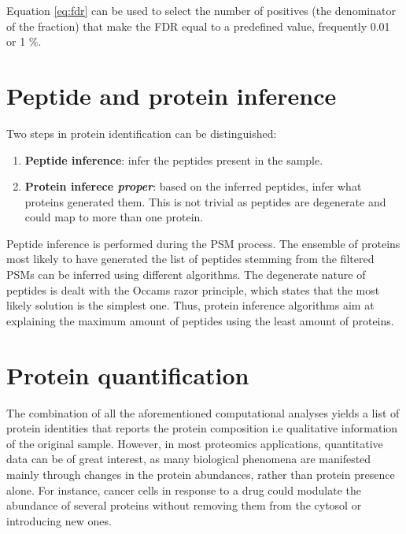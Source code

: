 \documentclass[11pt, a4paper]{report}
\begin{document}
Equation \ref{eq:fdr} can be used to select the number of positives (the denominator of the fraction) that make the FDR equal to a predefined value, frequently 0.01 or 1 \%.

%

\section{Peptide and protein inference}
\label{sec:inference}

Two steps in protein identification can be distinguished:

\begin{enumerate}

\item \textbf{Peptide inference}: infer the peptides present in the sample.
\item \textbf{Protein inferece \textit{proper}}: based on the inferred peptides, infer what proteins generated them. This is not trivial as peptides are degenerate and could map to more than one protein.
\end{enumerate}

Peptide inference is performed during the PSM process. The ensemble of proteins most likely to have generated the list of peptides stemming from the filtered PSMs can be inferred using different algorithms. The degenerate nature of peptides is dealt with the Occam\textquotesingle s razor principle, which states that the most likely solution is the simplest one. Thus, protein inference algorithms aim at explaining the maximum amount of peptides using the least amount of proteins.

\section{Protein quantification}
\label{sec:quantification}

The combination of all the aforementioned computational analyses yields a list of protein identities that reports the protein composition i.e qualitative information of the original sample. However, in most proteomics applications, quantitative data can be of great interest, as many biological phenomena are manifested mainly through changes in the protein abundances, rather than protein presence alone. For instance, cancer cells in response to a drug could modulate the abundance of several proteins without removing them from the cytosol or introducing new ones.
\end{document}

